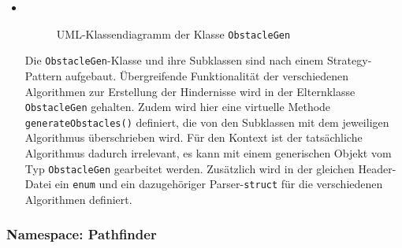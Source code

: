 \begin{itemize}
    \item {} \\
    \begin{figure}[H]
        \vspace{-0.5cm}
        \centering
        
        \caption{UML-Klassendiagramm der Klasse \texttt{ObstacleGen}}
        \label{fig:uml_obstacle_gen}
    \end{figure}
    Die \texttt{ObstacleGen}-Klasse und ihre Subklassen sind nach einem Strategy-Pattern aufgebaut.
    Übergreifende Funktionalität der verschiedenen Algorithmen zur Erstellung der Hindernisse wird in der Elternklasse \texttt{ObstacleGen} gehalten.
    Zudem wird hier eine virtuelle Methode \texttt{generateObstacles()} definiert, die von den Subklassen mit dem jeweiligen Algorithmus überschrieben wird.
    Für den Kontext ist der tatsächliche Algorithmus dadurch irrelevant, es kann mit einem generischen Objekt vom Typ \texttt{ObstacleGen} gearbeitet werden.
    Zusätzlich wird in der gleichen Header-Datei ein \texttt{enum} und ein dazugehöriger Parser-\texttt{struct} für die verschiedenen Algorithmen definiert.
\end{itemize}
    \subsubsection{Namespace: Pathfinder}
    \label{subsubsec:aufbau_backend_ueberblick_pathfinder}
